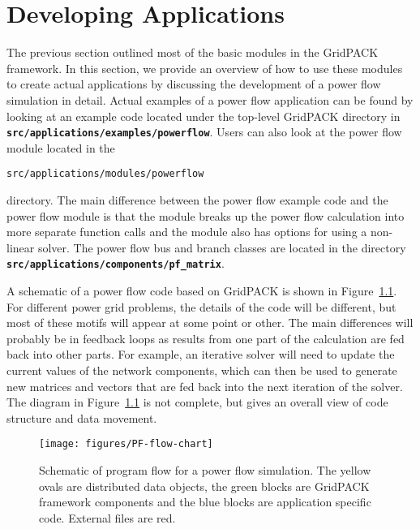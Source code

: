 \chapter{Developing Applications}

The previous section outlined most of the basic modules in the GridPACK
framework. In this section, we provide an overview of how to use these modules
to create actual applications by discussing the development of a power flow
simulation in detail. Actual examples of a power flow application can be found
by looking at an example code located under the top-level GridPACK directory in
\texttt{\textbf{src/applications/examples/powerflow}}. Users can also look at the power flow module located in the 

{
\color{red}
\begin{Verbatim}[fontseries=b]
src/applications/modules/powerflow 
\end{Verbatim}
}

directory. The main difference between the power flow example code and the power
flow module is that the module breaks up the power flow calculation into more
separate function calls and the module also has options for using a non-linear
solver. The power flow bus and branch classes are located in the directory
\texttt{\textbf{src/applications/components/pf\_matrix}}.

A schematic of a power flow code based on GridPACK is shown in
Figure~\ref{fig:pf-schematic}. For
different power grid problems, the details of the code will be different, but
most of these motifs will appear at some point or other. The main differences
will probably be in feedback loops as results from one part of the calculation
are fed back into other parts. For example, an iterative solver will need to
update the current values of the network components, which can then be used to
generate new matrices and vectors that are fed back into the next iteration of
the solver. The diagram in Figure~\ref{fig:pf-schematic} is not complete, but gives an overall view of code structure and data movement.

\begin{figure}
  \centering
    \texttt{[image: figures/PF-flow-chart]}
  \caption{Schematic of program flow for a power flow simulation. The yellow ovals are distributed data objects, the green blocks are GridPACK framework components and the blue blocks are application specific code. External files are red.}
  \label{fig:pf-schematic}
\end{figure}


